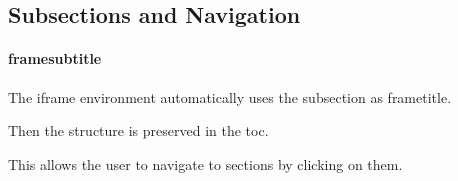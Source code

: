 \subsection{Subsections and Navigation}
\begin{iframe}
	\framesubtitle{framesubtitle}
	The iframe environment automatically uses the subsection as frametitle.

	Then the structure is preserved in the toc.
	
	This allows the user to navigate to sections by clicking on them.
\end{iframe}